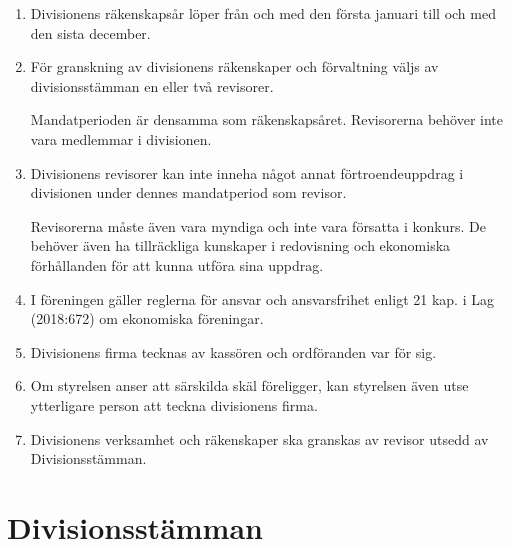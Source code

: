 \documentclass{dvd}
\begin{document}
	\begin{enumerate}[label=\arabic* §, ref=\arabic*]

		\item Divisionens räkenskapsår löper från och med den första januari till och med den sista december.

		\item För granskning av divisionens räkenskaper och förvaltning väljs av divisionsstämman en eller två revisorer.

		Mandatperioden är densamma som räkenskapsåret.
		Revisorerna behöver inte vara medlemmar i divisionen.

		\item Divisionens revisorer kan inte inneha något annat förtroendeuppdrag i divisionen under dennes mandatperiod som revisor.

		Revisorerna måste även vara myndiga och inte vara försatta i konkurs.
		De behöver även ha tillräckliga kunskaper i redovisning och ekonomiska förhållanden för att kunna utföra sina uppdrag.

		\item I föreningen gäller reglerna för ansvar och ansvarsfrihet enligt 21 kap. i Lag (2018:672) om ekonomiska föreningar.

		\item Divisionens firma tecknas av kassören och ordföranden var för sig.

		\item Om styrelsen anser att särskilda skäl föreligger, kan styrelsen även utse ytterligare person att teckna divisionens firma.

		\item Divisionens verksamhet och räkenskaper ska granskas av revisor utsedd av Divisionsstämman.

	\end{enumerate}

	\section{Divisionsstämman}
\end{document}
